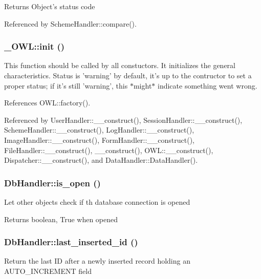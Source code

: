 \begin{DoxyReturn}{Returns}
Object's status code 
\end{DoxyReturn}


Referenced by SchemeHandler::compare().

\subsubsection[{init}]{\setlength{\rightskip}{0pt plus 5cm}\_\-OWL::init ()}\label{class__OWL_ae0ef3ded56e8a6b34b6461e5a721cd3e}
This function should be called by all constuctors. It initializes the general characteristics. Status is 'warning' by default, it's up to the contructor to set a proper status; if it's still 'warning', this $\ast$might$\ast$ indicate something went wrong. 

References OWL::factory().



Referenced by UserHandler::\_\-\_\-construct(), SessionHandler::\_\-\_\-construct(), SchemeHandler::\_\-\_\-construct(), LogHandler::\_\-\_\-construct(), ImageHandler::\_\-\_\-construct(), FormHandler::\_\-\_\-construct(), FileHandler::\_\-\_\-construct(), \_\-\_\-construct(), OWL::\_\-\_\-construct(), Dispatcher::\_\-\_\-construct(), and DataHandler::DataHandler().

\subsubsection[{is\_\-open}]{\setlength{\rightskip}{0pt plus 5cm}DbHandler::is\_\-open ()}\label{classDbHandler_aa342b2bd73c5f8ce05cadcba02f9cf5a}
Let other objects check if th database connection is opened

\begin{DoxyReturn}{Returns}
boolean, True when opened 
\end{DoxyReturn}
\subsubsection[{last\_\-inserted\_\-id}]{\setlength{\rightskip}{0pt plus 5cm}DbHandler::last\_\-inserted\_\-id ()}\label{classDbHandler_ad6be57a8dbb86dc1648c79b96128fc97}
Return the last ID after a newly inserted record holding an AUTO\_\-INCREMENT field


